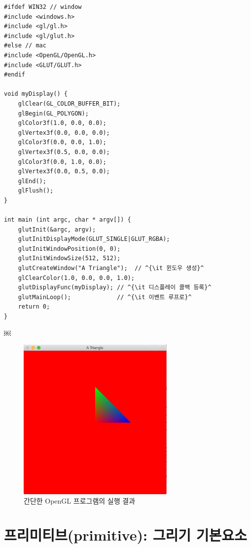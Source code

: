 \begin{algorithmbis}\label{code:OGL_opengl:example}
\lstset{language=C++, escapechar=^} 
\begin{lstlisting}
#ifdef WIN32 // window 
#include <windows.h>
#include <gl/gl.h>
#include <gl/glut.h>
#else // mac
#include <OpenGL/OpenGL.h>
#include <GLUT/GLUT.h>
#endif

void myDisplay() {
    glClear(GL_COLOR_BUFFER_BIT);
    glBegin(GL_POLYGON);
    glColor3f(1.0, 0.0, 0.0);
    glVertex3f(0.0, 0.0, 0.0);
    glColor3f(0.0, 0.0, 1.0);
    glVertex3f(0.5, 0.0, 0.0);
    glColor3f(0.0, 1.0, 0.0);
    glVertex3f(0.0, 0.5, 0.0);
    glEnd();
    glFlush();    
}

int main (int argc, char * argv[]) {
    glutInit(&argc, argv);
    glutInitDisplayMode(GLUT_SINGLE|GLUT_RGBA);
    glutInitWindowPosition(0, 0);
    glutInitWindowSize(512, 512);
    glutCreateWindow("A Triangle");  // ^{\it 윈도우 생성}^
    glClearColor(1.0, 0.0, 0.0, 1.0);
    glutDisplayFunc(myDisplay);	// ^{\it 디스플레이 콜백 등록}^
    glutMainLoop();				// ^{\it 이벤트 루프로}^
    return 0;
}
\end{lstlisting}
\end{algorithmbis}
￼



\begin{figure}[h!]
  \centering
    \includegraphics[height=8cm]{OGL_opengl/simpleEx.png}
    \caption{간단한 OpenGL 프로그램의 실행 결과}
    \label{fig:OGL_opengl:simpleEx}
\end{figure}


\section{프리미티브(primitive): 그리기 기본요소}

